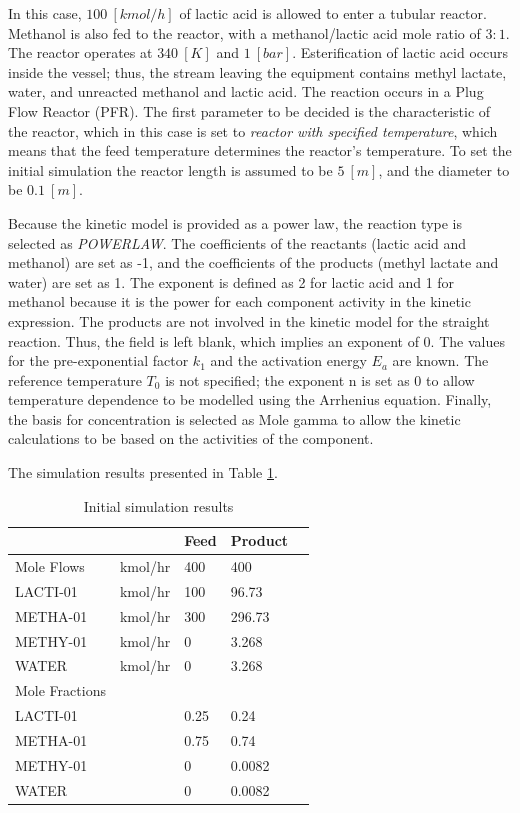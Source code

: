 In this case, $100~[kmol/h]$ of lactic acid is allowed to enter a tubular reactor. Methanol is also fed to the reactor, with a methanol/lactic acid mole ratio of $3:1$. The reactor operates at $340~[K]$ and $1~[bar]$. Esterification of lactic acid occurs inside the vessel; thus, the stream leaving the equipment contains methyl lactate, water, and unreacted methanol and lactic acid. The reaction occurs in a Plug Flow Reactor (PFR). The first parameter to be decided is the characteristic of the reactor, which in this case is set to \textit{reactor with specified temperature}, which means that the feed temperature determines the reactor's temperature. To set the initial simulation the reactor length is assumed to be $5~[m]$, and the diameter to be $0.1~[m]$. 

Because the kinetic model is provided as a power law, the reaction type is selected as \textit{POWERLAW}. The coefficients of the reactants (lactic acid and methanol) are set as -1, and the coefficients of the products (methyl lactate and water) are set as 1. The exponent is defined as 2 for lactic acid and 1 for methanol because it is the power for each component activity in the kinetic expression. The products are not involved in the kinetic model for the straight reaction. Thus, the field is left blank, which implies an exponent of 0. The values for the pre-exponential factor $k_1$ and the activation energy $E_a$ are known. The reference temperature $T_0$ is not specified; the exponent n is set as 0 to allow temperature dependence to be modelled using the Arrhenius equation. Finally, the basis for concentration is selected as Mole gamma to allow the kinetic calculations to be based on the activities of the component.

The simulation results presented in Table \ref{tab:Ester_Initial}.

\begin{table}[h!]
	\centering
	\begin{tabular}{ll|lll}
		&         	   & Feed 	 & Product 	&  \\ \hline
		Mole Flows     & kmol/hr & 400  	& 400     &  \\
		LACTI-01       & kmol/hr & 100  	& 96.73   &  \\
		METHA-01       & kmol/hr & 300  	& 296.73  &  \\
		METHY-01       & kmol/hr & 0    	& 3.268   &  \\
		WATER          & kmol/hr & 0    	& 3.268   &  \\ \hline
		Mole Fractions &         &      	&         &  \\
		LACTI-01       &         & 0.25 	& 0.24    &  \\
		METHA-01       &         & 0.75 	& 0.74    &  \\
		METHY-01       &         & 0    	& 0.0082  &  \\
		WATER          &         & 0    	& 0.0082  & 
	\end{tabular}
	\caption{Initial simulation results}
	\label{tab:Ester_Initial}
\end{table}

